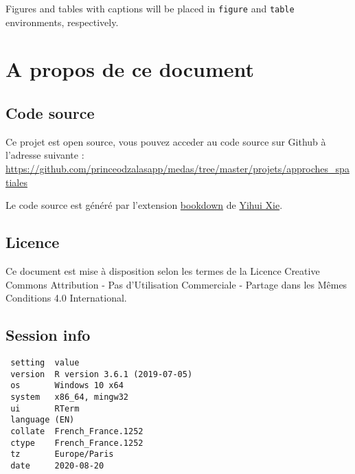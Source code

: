 \documentclass[
  french,
]{article}
\begin{document}
Figures and tables with captions will be placed in \texttt{figure} and \texttt{table} environments, respectively.

\hypertarget{a-propos-de-ce-document}{%
\section*{A propos de ce document}\label{a-propos-de-ce-document}}

\hypertarget{code-source}{%
\subsection*{Code source}\label{code-source}}

Ce projet est open source, vous pouvez acceder au code source sur Github à l'adresse suivante : \url{https://github.com/princeodzalasapp/medas/tree/master/projets/approches_spatiales}

Le code source est généré par l'extension \href{https://bookdown.org/yihui/bookdown/}{bookdown} de \href{https://yihui.name/en/}{Yihui Xie}.

\hypertarget{licence}{%
\subsection*{Licence}\label{licence}}

Ce document est mise à disposition selon les termes de la Licence Creative Commons Attribution - Pas d'Utilisation Commerciale - Partage dans les Mêmes Conditions 4.0 International.

\hypertarget{session-info}{%
\subsection*{Session info}\label{session-info}}

\begin{verbatim}
 setting  value                       
 version  R version 3.6.1 (2019-07-05)
 os       Windows 10 x64              
 system   x86_64, mingw32             
 ui       RTerm                       
 language (EN)                        
 collate  French_France.1252          
 ctype    French_France.1252          
 tz       Europe/Paris                
 date     2020-08-20                  
\end{verbatim}
\end{document}
